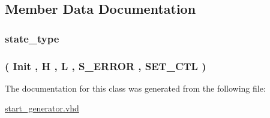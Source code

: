 \subsection{Member Data Documentation}
\subsubsection[{\texorpdfstring{state}{state}}]{ {\bfseries {\bfseries {\bf state\+\_\+type}} \textcolor{vhdlchar}{ }} \hspace{0.3cm}{\ttfamily [Signal]}}\hypertarget{classstart__generator_1_1fsm_ad5c908d9d78df85b2f0aa3b36b05c3a5}{}\label{classstart__generator_1_1fsm_ad5c908d9d78df85b2f0aa3b36b05c3a5}
\subsubsection[{\texorpdfstring{state\+\_\+type}{state_type}}]{ {\bfseries \textcolor{vhdlchar}{(}\textcolor{vhdlchar}{ }\textcolor{vhdlchar}{Init}\textcolor{vhdlchar}{ }\textcolor{vhdlchar}{,}\textcolor{vhdlchar}{ }\textcolor{vhdlchar}{H}\textcolor{vhdlchar}{ }\textcolor{vhdlchar}{,}\textcolor{vhdlchar}{ }\textcolor{vhdlchar}{L}\textcolor{vhdlchar}{ }\textcolor{vhdlchar}{,}\textcolor{vhdlchar}{ }\textcolor{vhdlchar}{S\+\_\+\+E\+R\+R\+OR}\textcolor{vhdlchar}{ }\textcolor{vhdlchar}{,}\textcolor{vhdlchar}{ }\textcolor{vhdlchar}{S\+E\+T\+\_\+\+C\+TL}\textcolor{vhdlchar}{ }\textcolor{vhdlchar}{)}\textcolor{vhdlchar}{ }} \hspace{0.3cm}{\ttfamily [Type]}}\hypertarget{classstart__generator_1_1fsm_a2699f3fb1f27a0f47ce4731bc1770ffb}{}\label{classstart__generator_1_1fsm_a2699f3fb1f27a0f47ce4731bc1770ffb}


The documentation for this class was generated from the following file\+:\begin{DoxyCompactItemize}
\item 
\hyperlink{start__generator_8vhd}{start\+\_\+generator.\+vhd}\end{DoxyCompactItemize}
